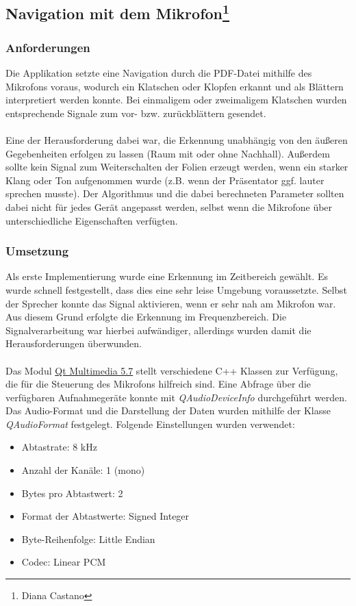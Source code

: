 \subsection[Navigation mit dem Mikrofon]{Navigation mit dem Mikrofon\footnote{Diana Castano}}
\thispagestyle{fancy}

\subsubsection{Anforderungen}
Die Applikation setzte eine Navigation durch die PDF-Datei mithilfe des Mikrofons voraus, wodurch ein Klatschen oder Klopfen erkannt und als Blättern interpretiert werden konnte. Bei einmaligem oder zweimaligem Klatschen wurden entsprechende Signale zum vor- bzw. zurückblättern gesendet. \\
\\
Eine der Herausforderung dabei war, die Erkennung unabhängig von den äußeren Gegebenheiten erfolgen zu lassen (Raum mit oder ohne Nachhall). Außerdem sollte kein Signal zum Weiterschalten der Folien erzeugt werden, wenn ein starker Klang oder Ton aufgenommen wurde (z.B. wenn der Präsentator ggf. lauter sprechen musste). Der Algorithmus und die dabei berechneten Parameter sollten dabei nicht für jedes Gerät angepasst werden, selbst wenn die Mikrofone über unterschiedliche Eigenschaften verfügten. 

\subsubsection{Umsetzung}
Als erste Implementierung wurde eine Erkennung im Zeitbereich gewählt. Es wurde schnell festgestellt, dass dies eine sehr leise Umgebung voraussetzte. Selbst der Sprecher konnte das Signal aktivieren, wenn er sehr nah am Mikrofon war. Aus diesem Grund erfolgte die Erkennung im Frequenzbereich. Die Signalverarbeitung war hierbei aufwändiger, allerdings wurden damit die Herausforderungen überwunden.\\
\\
Das Modul  \href{http://doc.qt.io/qt-5/qtmultimedia-index.html}{Qt Multimedia 5.7} stellt verschiedene C++ Klassen zur Verfügung, die für die Steuerung des Mikrofons hilfreich sind. Eine Abfrage über die verfügbaren Aufnahmegeräte konnte mit \textit{QAudioDeviceInfo} durchgeführt werden. Das Audio-Format und die Darstellung der Daten wurden mithilfe der Klasse \textit{QAudioFormat} festgelegt. Folgende Einstellungen wurden verwendet:

\begin{center}
	\begin{itemize}
		\item Abtastrate: 8 kHz
		\item Anzahl der Kanäle: 1 (mono)
		\item Bytes pro Abtastwert: 2
		\item Format der Abtastwerte: Signed Integer
		\item Byte-Reihenfolge: Little Endian
		\item Codec: Linear PCM	
	\end{itemize}
\end{center}

